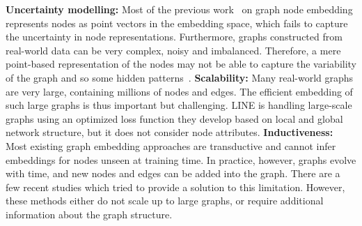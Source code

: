 \documentclass[runningheads]{llncs}
\begin{document}
\textbf{Uncertainty modelling:} Most of the previous work~\cite{DBLP:node2vec,DBLP:graphsage,DBLP:deepwalk,DBLP:line} on graph node embedding represents nodes as point vectors in the embedding space, which fails to capture the uncertainty in node representations. Furthermore, graphs constructed from real-world data can be very complex, noisy and imbalanced. Therefore, a mere point-based representation of the nodes may not be able to capture the variability of the graph and so some hidden patterns~\cite{g2g}. 
\textbf{Scalability:} Many real-world graphs are very large, containing millions of nodes and edges. The efficient embedding of such large graphs is thus important but challenging. LINE \cite{DBLP:line} is handling large-scale graphs using an optimized loss function they develop based on local and global network structure, but it does not consider node attributes. 
\textbf{Inductiveness:} Most existing graph embedding approaches are transductive and cannot infer embeddings for nodes unseen at training time. In practice, however, graphs evolve with time, and new nodes and edges can be added into the graph. There are a few recent studies \cite{g2g,DBLP:graphsage} which tried to provide a solution to this limitation. 
However, these methods either do not scale up to large graphs, or require additional information about the graph structure. 
\end{document}
